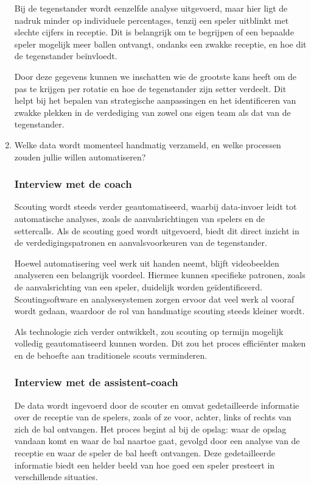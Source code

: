 \begin{enumerate}
  Bij de tegenstander wordt eenzelfde analyse uitgevoerd, maar hier ligt de nadruk minder op individuele percentages, tenzij een speler uitblinkt met slechte cijfers in receptie. Dit is belangrijk om te begrijpen of een bepaalde speler mogelijk meer ballen ontvangt, ondanks een zwakke receptie, en hoe dit de tegenstander beïnvloedt.

  Door deze gegevens kunnen we inschatten wie de grootste kans heeft om de pas te krijgen per rotatie en hoe de tegenstander zijn setter verdeelt. Dit helpt bij het bepalen van strategische aanpassingen en het identificeren van zwakke plekken in de verdediging van zowel ons eigen team als dat van de tegenstander.
  \item Welke data wordt momenteel handmatig verzameld, en welke processen zouden jullie willen automatiseren?
  \subsubsection{Interview met de coach}
  Scouting wordt steeds verder geautomatiseerd, waarbij data-invoer leidt tot automatische analyses, zoals de aanvalsrichtingen van spelers en de settercalls. Als de scouting goed wordt uitgevoerd, biedt dit direct inzicht in de verdedigingspatronen en aanvalsvoorkeuren van de tegenstander.

  Hoewel automatisering veel werk uit handen neemt, blijft videobeelden analyseren een belangrijk voordeel. Hiermee kunnen specifieke patronen, zoals de aanvalsrichting van een speler, duidelijk worden geïdentificeerd. Scoutingsoftware en analysesystemen zorgen ervoor dat veel werk al vooraf wordt gedaan, waardoor de rol van handmatige scouting steeds kleiner wordt.

  Als technologie zich verder ontwikkelt, zou scouting op termijn mogelijk volledig geautomatiseerd kunnen worden. Dit zou het proces efficiënter maken en de behoefte aan traditionele scouts verminderen.
  \subsubsection{Interview met de assistent-coach}
  De data wordt ingevoerd door de scouter en omvat gedetailleerde informatie over de receptie van de spelers, zoals of ze voor, achter, links of rechts van zich de bal ontvangen. Het proces begint al bij de opslag: waar de opslag vandaan komt en waar de bal naartoe gaat, gevolgd door een analyse van de receptie en waar de speler de bal heeft ontvangen. Deze gedetailleerde informatie biedt een helder beeld van hoe goed een speler presteert in verschillende situaties.


\end{enumerate}
